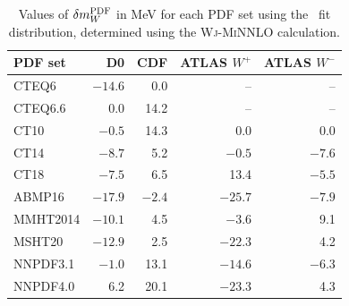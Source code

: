 \begin{table}[!tbp]
  \centering 
\begin{tabular}{lrrrr}
\hline \hline 
              PDF set  &        D0   &            CDF &  ATLAS $W^+$ &  ATLAS $W^-$ \\
\hline
              CTEQ6    &     $-14.6$ &            0.0 &           -- &           -- \\ 
              CTEQ6.6  &         0.0 &           14.2 &           -- &           -- \\ 
              CT10     &      $-0.5$ &           14.3 &          0.0 &          0.0 \\ 
              CT14     &      $-8.7$ &            5.2 &       $-0.5$ &       $-7.6$ \\ 
              CT18     &      $-7.5$ &            6.5 &         13.4 &       $-5.5$ \\ 
              ABMP16   &     $-17.9$ &         $-2.4$ &      $-25.7$ &       $-7.9$ \\ 
              MMHT2014 &     $-10.1$ &            4.5 &       $-3.6$ &          9.1 \\ 
              MSHT20   &     $-12.9$ &            2.5 &      $-22.3$ &          4.2 \\ 
              NNPDF3.1 &      $-1.0$ &           13.1 &      $-14.6$ &       $-6.3$ \\ 
              NNPDF4.0 &         6.2 &           20.1 &      $-23.3$ &          4.3 \\ 
\hline \hline
\end{tabular}
  \caption{Values of $\delta m_W^{\scriptsize\textrm{PDF}}$ in MeV for each PDF set using the \mT~fit
  distribution, determined using the {\textsc{Wj-MiNNLO}} calculation.
}
\label{tab:shiftmT}
\end{table}

